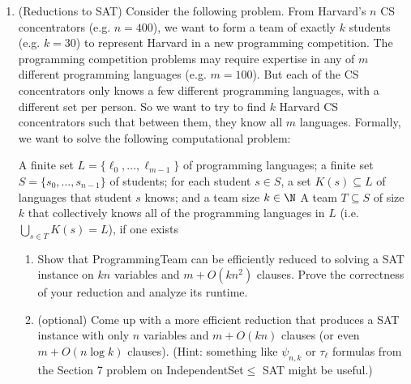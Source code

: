 \documentclass[11pt]{article}
\begin{document}
\begin{enumerate}
\begin{enumerate}
  \end{enumerate}
  
\item (Reductions to SAT)  Consider the following problem.  From Harvard's $n$ CS concentrators (e.g. $n=400$), we want to form a team of exactly $k$ students (e.g. $k=30$) to represent Harvard in a new programming competition.  The programming competition problems may require expertise in any of $m$ different programming languages (e.g. $m=100$).  But each of the CS concentrators only knows a few different programming languages, with a different set per person. So we want to try to find $k$ Harvard CS concentrators such that between them, they know all $m$ languages. Formally, we want to solve the following computational problem:

{A finite set $L=\{\ell_0,\ldots,\ell_{m-1}\}$ of programming languages; a finite set 
$S=\{s_0,\ldots,s_{n-1}\}$ of students; for each student $s\in S$, a set $K(s)\subseteq L$ of languages that student $s$ knows; and a team size $k\in \N$}
{A team $T\subseteq S$ of size $k$ that collectively knows all of the programming languages in $L$ (i.e. $\bigcup_{s\in T} K(s)=L$), if one exists}

\begin{enumerate}
    \item 
Show that ProgrammingTeam can be efficiently reduced to solving a SAT instance on $kn$ variables and $m+O(kn^2)$ clauses.  Prove the correctness of your reduction and analyze its runtime.

\item 
(optional\footnotemark[1])
Come up with a more efficient reduction that produces a SAT instance with only $n$ variables and $m+O(kn)$ clauses (or even $m+O(n\log k)$ clauses). (Hint: something like $\psi_{n,k}$ or $\tau_\ell$ formulas from the Section 7 problem on IndependentSet$\leq$ SAT might be useful.)
\end{enumerate}
 
\end{enumerate}
\end{document}
